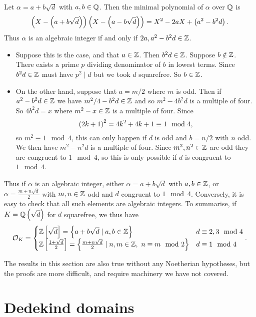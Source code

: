 Let $ \alpha = a + b\sqrt{d} $ with $ a, b \in \mathbb{Q} $. Then the minimal polynomial of $ \alpha $ over $ \mathbb{Q} $ is
$$ \left( X - \left( a + b\sqrt{d} \right) \right)\left( X - \left( a - b\sqrt{d} \right) \right) = X^2 - 2aX + \left( a^2 - b^2d \right). $$
Thus $ \alpha $ is an algebraic integer if and only if $ 2a, a^2 - b^2d \in \mathbb{Z} $.
\begin{itemize}
\item Suppose this is the case, and that $ a \in \mathbb{Z} $. Then $ b^2d \in \mathbb{Z} $. Suppose $ b \notin \mathbb{Z} $. There exists a prime $ p $ dividing denominator of $ b $ in lowest terms. Since $ b^2d \in \mathbb{Z} $ must have $ p^2 \mid d $ but we took $ d $ squarefree. So $ b \in \mathbb{Z} $.
\item On the other hand, suppose that $ a = m / 2 $ where $ m $ is odd. Then if $ a^2 - b^2d \in \mathbb{Z} $ we have $ m^2 / 4 - b^2d \in \mathbb{Z} $ and so $ m^2 - 4b^2d $ is a multiple of four. So $ 4b^2d = x $ where $ m^2 - x \in \mathbb{Z} $ is a multiple of four. Since
$$ \left( 2k + 1 \right)^2 = 4k^2 + 4k + 1 \equiv 1 \mod 4, $$
so $ m^2 \equiv 1 \mod 4 $, this can only happen if $ d $ is odd and $ b = n / 2 $ with $ n $ odd. We then have $ m^2 - n^2d $ is a multiple of four. Since $ m^2, n^2 \in \mathbb{Z} $ are odd they are congruent to $ 1 \mod 4 $, so this is only possible if $ d $ is congruent to $ 1 \mod 4 $.
\end{itemize}
Thus if $ \alpha $ is an algebraic integer, either $ \alpha = a + b\sqrt{d} $ with $ a, b \in \mathbb{Z} $, or $ \alpha = \tfrac{m + n\sqrt{d}}{2} $ with $ m, n \in \mathbb{Z} $ odd and $ d $ congruent to $ 1 \mod 4 $. Conversely, it is easy to check that all such elements are algebraic integers. To summarise, if $ K = \mathbb{Q}\left( \sqrt{d} \right) $ for $ d $ squarefree, we thus have
$$ \mathcal{O}_K =
\begin{cases}
\mathbb{Z}\left[ \sqrt{d} \right] = \left\{ a + b\sqrt{d} \mid a, b \in \mathbb{Z} \right\} & d \equiv 2, 3 \mod 4 \\
\mathbb{Z}\left[ \tfrac{1 + \sqrt{d}}{2} \right] = \left\{ \tfrac{m + n\sqrt{d}}{2} \mid n, m \in \mathbb{Z}, \ n \equiv m \mod 2 \right\} & d \equiv 1 \mod 4
\end{cases}.
$$

\begin{note*}
The results in this section are also true without any Noetherian hypotheses, but the proofs are more difficult, and require machinery we have not covered.
\end{note*}

\pagebreak

\section{Dedekind domains}


